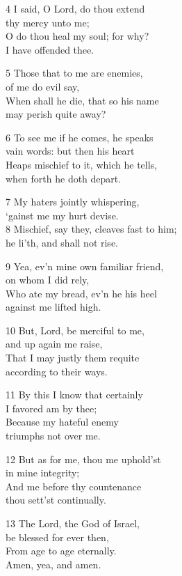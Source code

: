 4 I said, O Lord, do thou extend\\
thy mercy unto me;\\
O do thou heal my soul; for why?\\
I have offended thee.

5 Those that to me are enemies,\\
of me do evil say,\\
When shall he die, that so his name\\
may perish quite away?

6 To see me if he comes, he speaks\\
vain words: but then his heart\\
Heaps mischief to it, which he tells,\\
when forth he doth depart.

7 My haters jointly whispering,\\
‘gainst me my hurt devise.\\
8 Mischief, say they, cleaves fast to him;\\
he li’th, and shall not rise.

9 Yea, ev’n mine own familiar friend,\\
on whom I did rely,\\
Who ate my bread, ev’n he his heel\\
against me lifted high.

10 But, Lord, be merciful to me,\\
and up again me raise,\\
That I may justly them requite\\
according to their ways.

11 By this I know that certainly\\
I favored am by thee;\\
Because my hateful enemy\\
triumphs not over me.

12 But as for me, thou me uphold’st\\
in mine integrity;\\
And me before thy countenance\\
thou sett’st continually.

13 The Lord, the God of Israel,\\
be blessed for ever then,\\
From age to age eternally.\\
Amen, yea, and amen.

\begin{center}
\quad{}\quad{}
\end{center}




